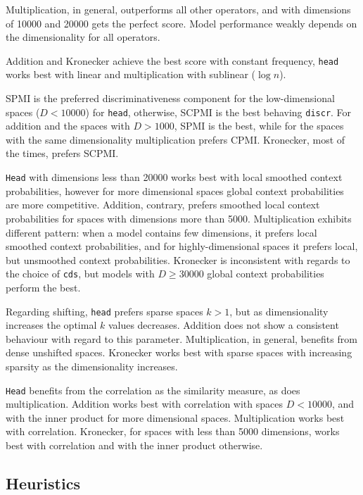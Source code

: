 Multiplication, in general, outperforms all other operators, and with dimensions of 10000 and 20000 gets the perfect score. Model performance weakly depends on the dimensionality for all operators.

Addition and Kronecker achieve the best score with constant frequency, \texttt{head} works best with linear and multiplication with sublinear ($\log n$).

SPMI is the preferred discriminativeness component for the low-dimensional spaces ($D < 10000$) for \texttt{head}, otherwise, SCPMI is the best behaving \texttt{discr}. For addition and the spaces with $D > 1000$, SPMI is the best, while for the spaces with the same dimensionality multiplication prefers CPMI. Kronecker, most of the times, prefers SCPMI.

\texttt{Head} with dimensions less than 20000 works best with local smoothed context probabilities, however for more dimensional spaces global context probabilities are more competitive. Addition, contrary, prefers smoothed local context probabilities for spaces with dimensions more than 5000. Multiplication exhibits different pattern: when a model contains few dimensions, it prefers local smoothed context probabilities, and for highly-dimensional spaces it prefers local, but unsmoothed context probabilities. Kronecker is inconsistent with regards to the choice of \texttt{cds}, but models with $D \geq 30000$ global context probabilities perform the best.

Regarding shifting, \texttt{head} prefers sparse spaces $k > 1$, but as dimensionality increases the optimal $k$ values decreases. Addition does not show a consistent behaviour with regard to this parameter. Multiplication, in general, benefits from dense unshifted spaces. Kronecker works best with sparse spaces with increasing sparsity as the dimensionality increases.

\texttt{Head} benefits from the correlation as the similarity measure, as does multiplication. Addition works best with correlation with spaces $D < 10000$, and with the inner product for more dimensional spaces. Multiplication works best with correlation. Kronecker, for spaces with less than 5000 dimensions, works best with correlation and with the inner product otherwise.

\subsection{Heuristics}
\label{sec:heuristics-phraserel}

